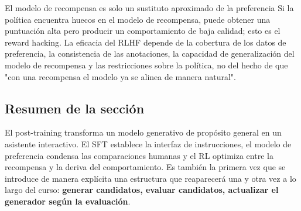 \begin{warningbox}{El modelo de recompensa es solo un sustituto aproximado de la preferencia}
Si la política encuentra huecos en el modelo de recompensa, puede obtener una puntuación alta pero producir un comportamiento de baja calidad; esto es el reward hacking. La eficacia del RLHF depende de la cobertura de los datos de preferencia, la consistencia de las anotaciones, la capacidad de generalización del modelo de recompensa y las restricciones sobre la política, no del hecho de que "con una recompensa el modelo ya se alinea de manera natural".
\end{warningbox}

\subsection{Resumen de la sección}

El post-training transforma un modelo generativo de propósito general en un asistente interactivo. El SFT establece la interfaz de instrucciones, el modelo de preferencia condensa las comparaciones humanas y el RL optimiza entre la recompensa y la deriva del comportamiento. Es también la primera vez que se introduce de manera explícita una estructura que reaparecerá una y otra vez a lo largo del curso: \textbf{generar candidatos, evaluar candidatos, actualizar el generador según la evaluación}.

